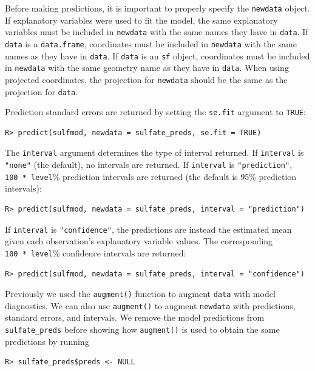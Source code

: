 \documentclass[10pt,letterpaper]{article}
\begin{document}
Before making predictions, it is important to properly specify the
\texttt{newdata} object. If explanatory variables were used to fit the
model, the same explanatory variables must be included in
\texttt{newdata} with the same names they have in \texttt{data}. If
\texttt{data} is a \texttt{data.frame}, coordinates must be included in
\texttt{newdata} with the same names as they have in \texttt{data}. If
\texttt{data} is an \texttt{sf} object, coordinates must be included in
\texttt{newdata} with the same geometry name as they have in
\texttt{data}. When using projected coordinates, the projection for
\texttt{newdata} should be the same as the projection for \texttt{data}.

Prediction standard errors are returned by setting the \texttt{se.fit}
argument to \texttt{TRUE}:

\begin{verbatim}
R> predict(sulfmod, newdata = sulfate_preds, se.fit = TRUE)
\end{verbatim}

The \texttt{interval} argument determines the type of interval returned.
If \texttt{interval} is \texttt{"none"} (the default), no intervals are
returned. If \texttt{interval} is \texttt{"prediction"},
\texttt{100\ *\ level}\% prediction intervals are returned (the default
is 95\% prediction intervals):

\begin{verbatim}
R> predict(sulfmod, newdata = sulfate_preds, interval = "prediction")
\end{verbatim}

If \texttt{interval} is \texttt{"confidence"}, the predictions are
instead the estimated mean given each observation's explanatory variable
values. The corresponding \texttt{100\ *\ level}\% confidence intervals
are returned:

\begin{verbatim}
R> predict(sulfmod, newdata = sulfate_preds, interval = "confidence")
\end{verbatim}

Previously we used the \texttt{augment()} function to augment
\texttt{data} with model diagnostics. We can also use \texttt{augment()}
to augment \texttt{newdata} with predictions, standard errors, and
intervals. We remove the model predictions from \texttt{sulfate\_preds}
before showing how \texttt{augment()} is used to obtain the same
predictions by running

\begin{verbatim}
R> sulfate_preds$preds <- NULL
\end{verbatim}
\end{document}
